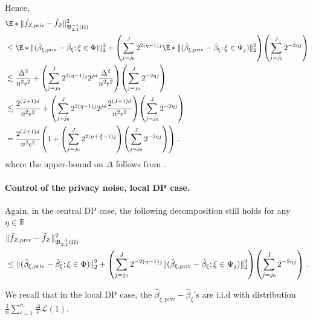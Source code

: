 \documentclass{article}
\newcommand{\R}{\mathbb{R}}
\newcommand{\1}{\mathds{1}}
\DeclarePairedDelimiter{\paren}{\lparen}{\rparen}
\theoremstyle{plain}
\theoremstyle{definition}
\theoremstyle{remark}
\begin{document}
Hence,
\begin{equation}
\begin{aligned}
    &\E*{\| \tilde{f}_{Z, \textrm{priv}} - \tilde{f}_{Z}\|_{{\mathfrak{B}}_{2, 1}^{-1}(\Omega)}^2} \\
    &\overset{}{\leq }
    \E*{\| (\hat{\beta}_{\xi, \textrm{priv}} - \hat{\beta}_{\xi};  \xi \in \Phi) \|_2^2}
    + \paren*{\sum_{j = j_0}^J 2^{2 (\eta - 1)j} \E*{\|(\hat{\beta}_{\xi, \textrm{priv}} - \hat{\beta}_{\xi};  \xi \in \Psi_j) \|_{2}^2}}
    \paren*{\sum_{j = j_0}^J 2^{-2 \eta j} } \\
    &\lesssim
     \frac{\Delta^2}{n^2 \epsilon^2}
    + \paren*{\sum_{j = j_0}^J 2^{2 (\eta - 1)j} 2^{j d} \frac{\Delta^2}{n^2 \epsilon^2}}
    \paren*{\sum_{j = j_0}^J 2^{-2 \eta j} } \\
    &\lesssim
    \frac{2^{(J+1)d}}{n^2 \epsilon^2}
    + \paren*{\sum_{j = j_0}^J 2^{2 (\eta - 1)j} 2^{j d} \frac{2^{(J+1)d}}{n^2 \epsilon^2}}
    \paren*{\sum_{j = j_0}^J 2^{-2 \eta j} } \\
    &=
    \frac{2^{(J+1)d}}{n^2 \epsilon^2} \paren*{1 
    + \paren*{\sum_{j = j_0}^J 2^{2 (\eta + \frac{d}{2} - 1)j} }
    \paren*{\sum_{j = j_0}^J 2^{-2 \eta j} }} \;.
\end{aligned}
\end{equation}
where the upper-bound on $\Delta$ follows from . 




\paragraph{Control of the privacy noise, local DP case.}

Again, in the central DP case, the following decomposition still holds for any $\eta \in \R$
\begin{equation}
\begin{aligned}
    &\| \tilde{f}_{Z, \textrm{priv}} - \tilde{f}_{Z}\|_{{\mathfrak{B}}_{2, 1}^{-1}(\Omega)}^2 \\
    &\overset{\text{}}{\leq }
    \| (\hat{\beta}_{\xi, \textrm{priv}} - \hat{\beta}_{\xi};  \xi \in \Phi) \|_2^2
    + \paren*{\sum_{j = j_0}^J 2^{-2 (\eta - 1)j} \|(\hat{\beta}_{\xi, \textrm{priv}} - \hat{\beta}_{\xi};  \xi \in \Psi_j) \|_{2}^2}
    \paren*{\sum_{j = j_0}^J 2^{-2 \eta j} } \;.
\end{aligned}
\end{equation}

We recall that in the local DP case, the $\hat{\beta}_{\xi, \textrm{priv}} - \hat{\beta}_{\xi}$'s are i.i.d with distribution $\frac{1}{n } \sum_{i=1}^n \frac{\Delta}{\epsilon} \mathcal{L} (1)$. 
\end{document}
